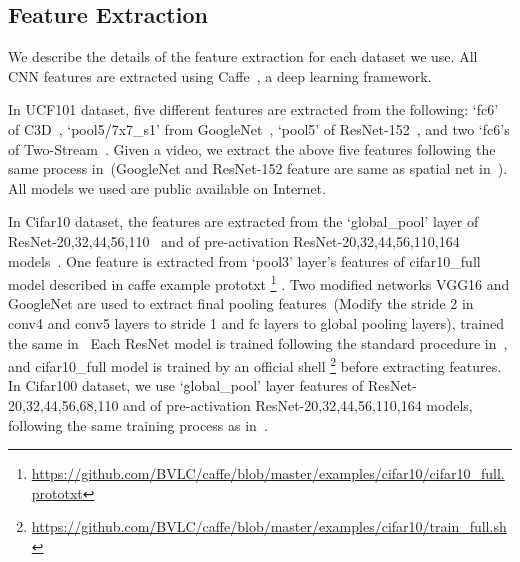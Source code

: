 \documentclass[letterpaper]{article}
\begin{document}


\subsection{Feature Extraction}
We describe the details of the feature extraction for each dataset we use.
All CNN features are extracted using Caffe~\cite{jia2014caffe}, a deep learning framework.

In UCF101 dataset, five different features are extracted from the following:
`fc6' of C3D~\cite{tran2015learning},
`pool5/7x7\_s1' from GoogleNet~\cite{szegedy2015going},
`pool5' of ResNet-152~\cite{he2015deep},
and two `fc6's of Two-Stream~\cite{simonyan2014two}.
Given a video, we extract the above five features following the same process in~\cite{simonyan2014two,tran2015learning}(GoogleNet and ResNet-152 feature are same as spatial net in~\cite{simonyan2014two}).
All models we used are public available on Internet. %

In Cifar10 dataset, the features are extracted from the `global\_pool' layer of ResNet-20,32,44,56,110~\cite{he2015deep} and of pre-activation ResNet-20,32,44,56,110,164 models~\cite{he2016identity}.
One feature is extracted from `pool3' layer's features of cifar10\_full model described in caffe example prototxt
\footnote{\url{https://github.com/BVLC/caffe/blob/master/examples/cifar10/cifar10_full.prototxt}}
.
Two modified networks VGG16 and GoogleNet are used to extract final pooling features~(Modify the stride 2 in conv4 and conv5 layers to stride 1 and fc layers to global pooling layers), trained the same in~\cite{he2015deep}
Each ResNet model is trained following the standard procedure in~\cite{he2015deep,he2016identity}, and cifar10\_full model is trained by an official shell
\footnote{\url{https://github.com/BVLC/caffe/blob/master/examples/cifar10/train_full.sh}}
before extracting features.
In Cifar100 dataset, we use `global\_pool' layer features of ResNet-20,32,44,56,68,110 and of pre-activation ResNet-20,32,44,56,110,164 models, following the same training process as in~\cite{he2015deep,he2016identity}.
\end{document}
